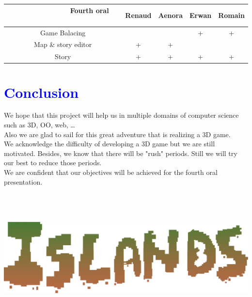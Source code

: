 \documentclass[article]{report} %
\begin{document}
\begin{center}
						~~~\begin{tabular}{|c|c|c|c|c|}
							\hline
								~~~~~~~~~~~~~ \textbf{Fourth oral} ~~~~~~~~~~~~  & \textbf{Renaud} & \textbf{Aenora} & \textbf{Erwan} & \textbf{Romain} \\
							\hline
 								Game Balacing &  &  & + & + \\
							\hline
								 Map \& story editor & + & + &  &  \\
							\hline
								 Story & + & + & + & + \\
							\hline
						\end{tabular}
\end{center}



				\chapter{\textcolor{blue}{Conclusion}}
					We hope that this project will help us in multiple domains of computer science such as 3D, \ac{OO}, web, \dots \\
					Also we are glad to sail for this great adventure that is realizing a 3D game. \\

					We acknowledge the difficulty of developing a 3D game but we are still motivated. Besides, we know that there will be "rush" periods. Still we will try our best to reduce those periods.\\
					We are confident that our objectives will be achieved for the fourth oral presentation.
\\ ~\\ ~\\ ~

					 

					


				\begin{center}
					\includegraphics[width = 16cm]{Images/Islands_Title.png}
				\end{center}     	     		
\end{document}
